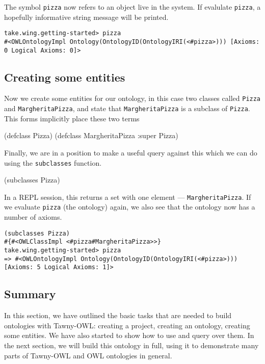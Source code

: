 \documentclass[11pt]{article}
\begin{document}
The symbol \texttt{pizza} now refers to an object live in the system. If
evalulate \texttt{pizza}, a hopefully informative string message will be
printed.


\begin{verbatim}
take.wing.getting-started> pizza
#<OWLOntologyImpl Ontology(OntologyID(OntologyIRI(<#pizza>))) [Axioms: 0 Logical Axioms: 0]>
\end{verbatim}


\subsection{Creating some entities}
\label{sec-4-4}

Now we create some entities for our ontology, in this case two classes
called \texttt{Pizza} and \texttt{MargheritaPizza}, and state that \texttt{MargheritaPizza}
is a subclass of \texttt{Pizza}. This forms implicitly place these two terms


\begin{tawny}
(defclass Pizza)
(defclass MargheritaPizza :super Pizza)
\end{tawny}

Finally, we are in a position to make a useful query against this which
we can do using the \texttt{subclasses} function.

\begin{tawny}
(subclasses Pizza)
\end{tawny}

In a REPL session, this returns a set with one element ---
\texttt{MargheritaPizza}. If we evaluate \texttt{pizza} (the ontology) again, we also
see that the ontology now has a number of axioms.


\begin{verbatim}
(subclasses Pizza)
#{#<OWLClassImpl <#pizza#MargheritaPizza>>}
take.wing.getting-started> pizza
=> #<OWLOntologyImpl Ontology(OntologyID(OntologyIRI(<#pizza>))) [Axioms: 5 Logical Axioms: 1]>
\end{verbatim}


\subsection{Summary}
\label{sec-4-5}

In this section, we have outlined the basic tasks that are needed to
build ontologies with Tawny-OWL: creating a project, creating an
ontology, creating some entities. We have also started to show how to
use and query over them. In the next section, we will build this
ontology in full, using it to demonstrate many parts of Tawny-OWL and
OWL ontologies in general.
\end{document}
